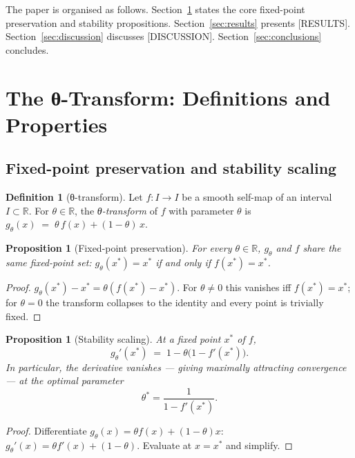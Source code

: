 \documentclass[aps,pre,twocolumn,superscriptaddress,nofootinbib,longbibliography]{revtex4-2}
\newcommand{\param}{\theta}                        %
\newcommand{\optparam}{\theta^{*}}                 %
\newcommand{\transform}{g_{\param}}                %
\newcommand{\transformof}[1]{g_{\param}(#1)}       %
\newcommand{\KMdef}{%
  g_{\param}(x) \;=\; \param\,f(x) + (1-\param)\,x}
\newcommand{\FP}{x^{*}}
\newcommand{\reals}{\mathbb{R}}
\theoremstyle{plain}
\newtheorem{proposition}[theorem]{Proposition}
\theoremstyle{definition}
\newtheorem{definition}[theorem]{Definition}
\theoremstyle{remark}
\begin{document}
The paper is organised as follows.
Section~\ref{sec:theory} states the core fixed-point
preservation and stability propositions.
Section~\ref{sec:results} presents [RESULTS].
Section~\ref{sec:discussion} discusses [DISCUSSION].
Section~\ref{sec:conclusions} concludes.

\section{The θ-Transform: Definitions and Properties}
\label{sec:theory}

\subsection{Fixed-point preservation and stability scaling}
\label{ssec:basic}

\begin{definition}[θ-transform]
\label{def:theta-transform}
Let $f : I \to I$ be a smooth self-map of an interval
$I \subset \reals$.  For $\param \in \reals$, the
\emph{θ-transform} of $f$ with parameter $\param$ is
$\KMdef$.
\end{definition}

\begin{proposition}[Fixed-point preservation]
\label{prop:fp-preservation}
For every $\param \in \reals$, $\transform$ and $f$ share the
same fixed-point set: $\transformof{\FP} = \FP$ if and only if
$f(\FP) = \FP$.
\end{proposition}
%
\begin{proof}
$\transformof{\FP} - \FP = \param(f(\FP) - \FP)$.  For
$\param \neq 0$ this vanishes iff $f(\FP) = \FP$; for
$\param = 0$ the transform collapses to the identity and
every point is trivially fixed.
\end{proof}

\begin{proposition}[Stability scaling]
\label{prop:stability}
At a fixed point $\FP$ of $f$,
%
\begin{equation}
  g_\param'(\FP) \;=\; 1 - \param\bigl(1 - f'(\FP)\bigr).
  \label{eq:stability-scaling}
\end{equation}
%
In particular, the derivative vanishes — giving maximally
attracting convergence — at the \emph{optimal parameter}
%
\begin{equation}
  \optparam = \frac{1}{1 - f'(\FP)}.
  \label{eq:optimal-theta}
\end{equation}
\end{proposition}
%
\begin{proof}
Differentiate $g_\param(x) = \param f(x) + (1-\param)x$:
$g_\param'(x) = \param f'(x) + (1-\param)$.  Evaluate at $x = \FP$
and simplify.
\end{proof}
\end{document}
